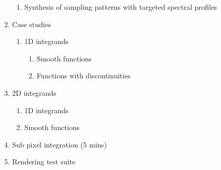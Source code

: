 \begin{enumerate}
\begin{enumerate}
		\item Synthesis of sampling patterns with targeted spectral profiles
	\end{enumerate}
	\item Case studies
	\begin{enumerate}
	\itemsep-0.4em
		\item 1D integrands
		\begin{enumerate}
		\itemsep-0.6em
			\item Smooth functions
			\item Functions with discontinuities
		\end{enumerate}
	\end{enumerate}
	\item 2D integrands
		\begin{enumerate}
		\itemsep-0.4em
			\item 1D integrands
			\item Smooth functions
		\end{enumerate}
	\item Sub pixel integration (5 mins)
	\item Rendering test suite
\end{enumerate}







